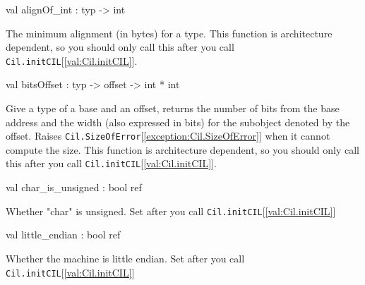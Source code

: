 \documentclass[11pt]{article}
\begin{document}
\label{val:Cil.alignOf-underscoreint}\begin{ocamldoccode}
val alignOf_int : typ -> int
\end{ocamldoccode}
\begin{ocamldocdescription}
The minimum alignment (in bytes) for a type. This function is 
 architecture dependent, so you should only call this after you call 
 {\tt{Cil.initCIL}}[\ref{val:Cil.initCIL}].


\end{ocamldocdescription}




\label{val:Cil.bitsOffset}\begin{ocamldoccode}
val bitsOffset : typ -> offset -> int * int
\end{ocamldoccode}
\begin{ocamldocdescription}
Give a type of a base and an offset, returns the number of bits from the 
 base address and the width (also expressed in bits) for the subobject 
 denoted by the offset. Raises {\tt{Cil.SizeOfError}}[\ref{exception:Cil.SizeOfError}] when it cannot compute 
 the size. This function is architecture dependent, so you should only call 
 this after you call {\tt{Cil.initCIL}}[\ref{val:Cil.initCIL}].


\end{ocamldocdescription}




\label{val:Cil.char-underscoreis-underscoreunsigned}\begin{ocamldoccode}
val char_is_unsigned : bool ref
\end{ocamldoccode}
\begin{ocamldocdescription}
Whether "char" is unsigned. Set after you call {\tt{Cil.initCIL}}[\ref{val:Cil.initCIL}]


\end{ocamldocdescription}




\label{val:Cil.little-underscoreendian}\begin{ocamldoccode}
val little_endian : bool ref
\end{ocamldoccode}
\begin{ocamldocdescription}
Whether the machine is little endian. Set after you call {\tt{Cil.initCIL}}[\ref{val:Cil.initCIL}]


\end{ocamldocdescription}
\end{document}
